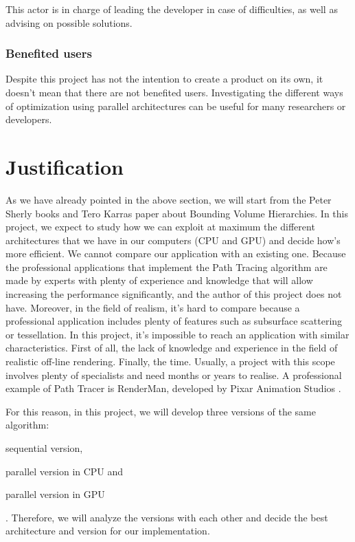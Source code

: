 \documentclass[titlepage,12pt]{report}
\begin{document}
This actor is in charge of leading the developer in case of difficulties, as well as advising on possible solutions.

\subsubsection{Benefited users}

Despite this project has not the intention to create a product on its own, it doesn't mean that there are not benefited users. Investigating the different ways of optimization using parallel architectures can be useful for many researchers or developers.

\section{Justification}

As we have already pointed in the above section, we will start from the Peter Sherly books and Tero Karras paper about Bounding Volume Hierarchies. In this project, we expect to study how we can exploit at maximum the different architectures that we have in our computers (CPU and GPU) and decide how's more efficient. We cannot compare our application with an existing one. Because the professional applications that implement the Path Tracing algorithm are made by experts with plenty of experience and knowledge that will allow increasing the performance significantly, and the author of this project does not have. Moreover, in the field of realism, it's hard to compare because a professional application includes plenty of features such as subsurface scattering or tessellation. In this project, it's impossible to reach an application with similar characteristics. First of all, the lack of knowledge and experience in the field of realistic off-line rendering.
Finally, the time. Usually, a project with this scope involves plenty of specialists and need months or years to realise. A professional example of Path Tracer is RenderMan, developed by Pixar Animation Studios \citep{Christensen2018}.

For this reason, in this project, we will develop three versions of the same algorithm: \begin{enumerate*}[label=\roman*)] \item sequential version, \item parallel version in CPU and \item parallel version in GPU \end{enumerate*}. Therefore, we will analyze the versions with each other and decide the best architecture and version for our implementation.
\end{document}
